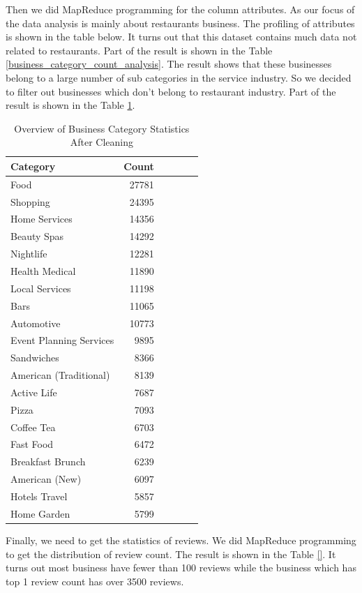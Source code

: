 \documentclass{stylefiles/capstone}
\begin{document}
Then we did MapReduce programming for the column attributes. As our focus of the data analysis is mainly about restaurants business. The profiling of attributes is shown in the table below. It turns out that this dataset contains much data not related to restaurants. Part of the result is shown in the Table \ref{business_category_count_analysis}. The result shows that these businesses belong to a large number of sub categories in the service industry. So we decided to filter out businesses which don't belong to restaurant industry. Part of the result is shown in the Table \ref{business_category_count_analysis_after_cleaning}.

\begin{table}[h!]
\centering
\begin{tabular}{l r r r r r} 
 \hline
 Category & Count \\ [0.5ex] 
 \hline
Food &	27781  \\
Shopping &	24395 \\
Home Services &	14356 \\
Beauty Spas &	14292 \\
Nightlife &	12281 \\
Health Medical &	11890 \\
Local Services &	11198 \\
Bars &	11065 \\
Automotive & 10773 \\
Event Planning  Services &	9895 \\
Sandwiches &	8366 \\
American (Traditional) &	8139 \\
Active Life &	7687 \\
Pizza &	7093 \\
Coffee Tea &	6703 \\
Fast Food &	6472 \\
Breakfast Brunch &	6239 \\
American (New) &	6097 \\
Hotels Travel &	5857 \\
Home Garden &	5799 \\
 [1ex] 
 \hline
\end{tabular}
\caption{Overview of Business Category Statistics After Cleaning}
\label{business_category_count_analysis_after_cleaning}
\end{table}

Finally, we need to get the statistics of reviews. We did MapReduce programming to get the distribution of review count. The result is shown in the Table \ref{}. It turns out most business have fewer than 100 reviews while the business which has top 1 review count has over 3500 reviews. 
\end{document}
